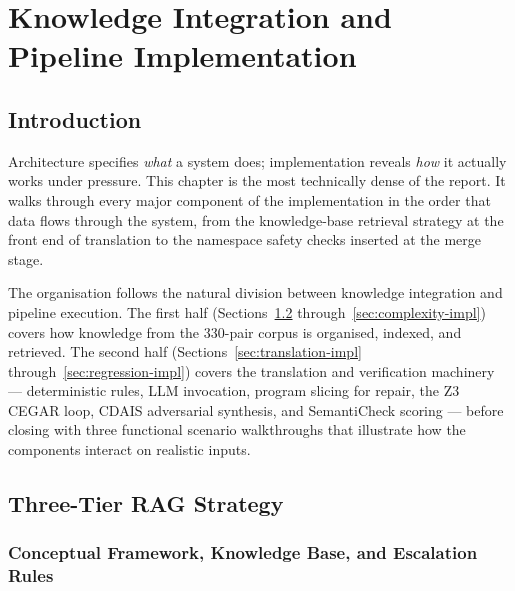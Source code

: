 
\chapter{Knowledge Integration and Pipeline Implementation}
\label{ch:implementation}

\section{Introduction}
\label{sec:ch5-intro}

Architecture specifies \emph{what} a system does; implementation reveals
\emph{how} it actually works under pressure. This chapter is the most
technically dense of the report. It walks through every major component of
the \codara{} implementation in the order that data flows through the system,
from the knowledge-base retrieval strategy at the front end of translation to
the namespace safety checks inserted at the merge stage.

The organisation follows the natural division between knowledge integration
and pipeline execution. The first half (Sections~\ref{sec:rag-impl}
through~\ref{sec:complexity-impl}) covers how knowledge from the 330-pair
corpus is organised, indexed, and retrieved. The second half
(Sections~\ref{sec:translation-impl} through~\ref{sec:regression-impl})
covers the translation and verification machinery --- deterministic rules,
LLM invocation, program slicing for repair, the Z3 CEGAR loop, CDAIS
adversarial synthesis, and SemantiCheck scoring --- before closing with three
functional scenario walkthroughs that illustrate how the components interact
on realistic inputs.

\section{Three-Tier RAG Strategy}
\label{sec:rag-impl}

\subsection{Conceptual Framework, Knowledge Base, and Escalation Rules}
\label{subsec:rag-framework}

